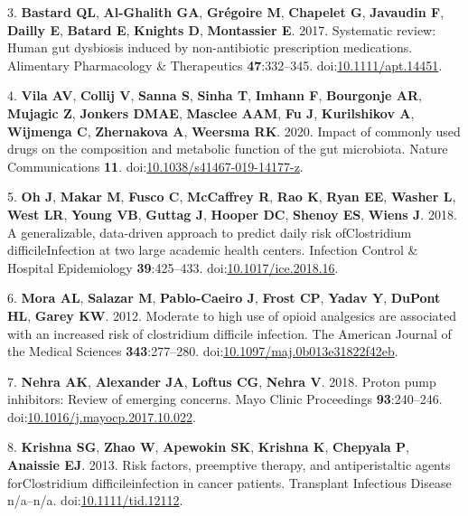 \documentclass[
  11pt,
]{article}
\begin{document}
\leavevmode\hypertarget{ref-LeBastard2017}{}%
3. \textbf{Bastard QL}, \textbf{Al-Ghalith GA}, \textbf{Grégoire M},
\textbf{Chapelet G}, \textbf{Javaudin F}, \textbf{Dailly E},
\textbf{Batard E}, \textbf{Knights D}, \textbf{Montassier E}. 2017.
Systematic review: Human gut dysbiosis induced by non-antibiotic
prescription medications. Alimentary Pharmacology \& Therapeutics
\textbf{47}:332--345.
doi:\href{https://doi.org/10.1111/apt.14451}{10.1111/apt.14451}.

\leavevmode\hypertarget{ref-VichVila2020}{}%
4. \textbf{Vila AV}, \textbf{Collij V}, \textbf{Sanna S}, \textbf{Sinha
T}, \textbf{Imhann F}, \textbf{Bourgonje AR}, \textbf{Mujagic Z},
\textbf{Jonkers DMAE}, \textbf{Masclee AAM}, \textbf{Fu J},
\textbf{Kurilshikov A}, \textbf{Wijmenga C}, \textbf{Zhernakova A},
\textbf{Weersma RK}. 2020. Impact of commonly used drugs on the
composition and metabolic function of the gut microbiota. Nature
Communications \textbf{11}.
doi:\href{https://doi.org/10.1038/s41467-019-14177-z}{10.1038/s41467-019-14177-z}.

\leavevmode\hypertarget{ref-Oh2018}{}%
5. \textbf{Oh J}, \textbf{Makar M}, \textbf{Fusco C}, \textbf{McCaffrey
R}, \textbf{Rao K}, \textbf{Ryan EE}, \textbf{Washer L}, \textbf{West
LR}, \textbf{Young VB}, \textbf{Guttag J}, \textbf{Hooper DC},
\textbf{Shenoy ES}, \textbf{Wiens J}. 2018. A generalizable, data-driven
approach to predict daily risk ofClostridium difficileInfection at two
large academic health centers. Infection Control \& Hospital
Epidemiology \textbf{39}:425--433.
doi:\href{https://doi.org/10.1017/ice.2018.16}{10.1017/ice.2018.16}.

\leavevmode\hypertarget{ref-Mora2012}{}%
6. \textbf{Mora AL}, \textbf{Salazar M}, \textbf{Pablo-Caeiro J},
\textbf{Frost CP}, \textbf{Yadav Y}, \textbf{DuPont HL}, \textbf{Garey
KW}. 2012. Moderate to high use of opioid analgesics are associated with
an increased risk of clostridium difficile infection. The American
Journal of the Medical Sciences \textbf{343}:277--280.
doi:\href{https://doi.org/10.1097/maj.0b013e31822f42eb}{10.1097/maj.0b013e31822f42eb}.

\leavevmode\hypertarget{ref-Nehra2018}{}%
7. \textbf{Nehra AK}, \textbf{Alexander JA}, \textbf{Loftus CG},
\textbf{Nehra V}. 2018. Proton pump inhibitors: Review of emerging
concerns. Mayo Clinic Proceedings \textbf{93}:240--246.
doi:\href{https://doi.org/10.1016/j.mayocp.2017.10.022}{10.1016/j.mayocp.2017.10.022}.

\leavevmode\hypertarget{ref-Krishna2013}{}%
8. \textbf{Krishna SG}, \textbf{Zhao W}, \textbf{Apewokin SK},
\textbf{Krishna K}, \textbf{Chepyala P}, \textbf{Anaissie EJ}. 2013.
Risk factors, preemptive therapy, and antiperistaltic agents
forClostridium difficileinfection in cancer patients. Transplant
Infectious Disease n/a--n/a.
doi:\href{https://doi.org/10.1111/tid.12112}{10.1111/tid.12112}.
\end{document}
